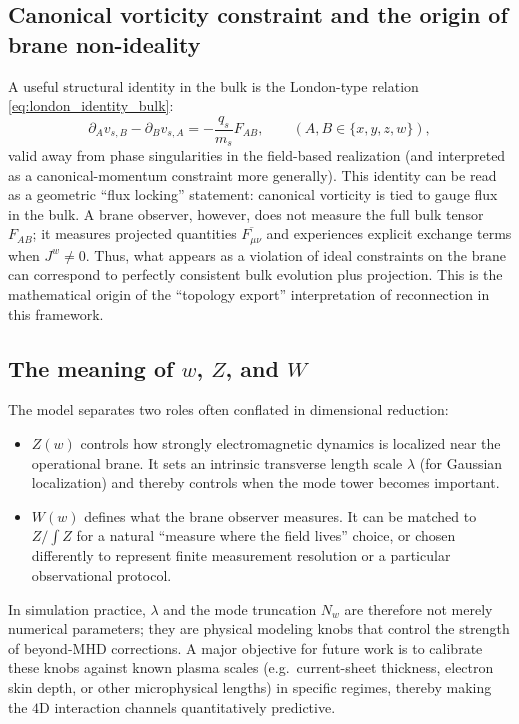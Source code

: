 \documentclass[11pt]{article}
\newcommand{\Z}{Z}              %
\newcommand{\W}{W}              %
\newcommand{\Proj}[1]{\overline{#1}} %
\begin{document}
\subsection{Canonical vorticity constraint and the origin of brane non-ideality}
A useful structural identity in the bulk is the London-type relation
\eqref{eq:london_identity_bulk}:
\begin{equation}
\partial_A v_{s,B}-\partial_B v_{s,A}
= -\frac{q_s}{m_s}F_{AB},
\qquad (A,B\in\{x,y,z,w\}),
\label{eq:discussion_london}
\end{equation}
valid away from phase singularities in the field-based realization (and interpreted
as a canonical-momentum constraint more generally). This identity can be read as a
geometric ``flux locking'' statement: canonical vorticity is tied to gauge flux in
the bulk. A brane observer, however, does not measure the full bulk tensor \(F_{AB}\);
it measures projected quantities \(\Proj{F_{\mu\nu}}\) and experiences explicit exchange
terms when \(J^w\neq 0\). Thus, what appears as a violation of ideal constraints on the
brane can correspond to perfectly consistent bulk evolution plus projection. This is
the mathematical origin of the ``topology export'' interpretation of reconnection in
this framework.

\subsection{The meaning of \texorpdfstring{$w$}{w}, \texorpdfstring{$\Z$}{Z}, and \texorpdfstring{$\W$}{W}}
The model separates two roles often conflated in dimensional reduction:
\begin{itemize}[leftmargin=1.7em]
\item \(\Z(w)\) controls how strongly electromagnetic dynamics is localized near the
operational brane. It sets an intrinsic transverse length scale \(\lambda\) (for
Gaussian localization) and thereby controls when the mode tower becomes important.
\item \(\W(w)\) defines what the brane observer measures. It can be matched to \(\Z/\!\int\Z\)
for a natural ``measure where the field lives'' choice, or chosen differently to
represent finite measurement resolution or a particular observational protocol.
\end{itemize}
In simulation practice, \(\lambda\) and the mode truncation \(N_w\) are therefore not
merely numerical parameters; they are physical modeling knobs that control the strength
of beyond-MHD corrections. A major objective for future work is to calibrate these knobs
against known plasma scales (e.g.\ current-sheet thickness, electron skin depth, or
other microphysical lengths) in specific regimes, thereby making the \(4\)D interaction
channels quantitatively predictive.
\end{document}
